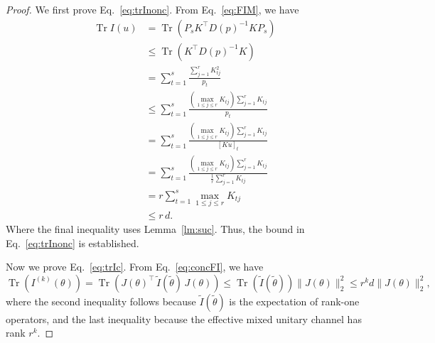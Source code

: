 \documentclass[10pt,a4paper]{amsart}
\begin{document}
\begin{proof}
We first prove Eq.~\ref{eq:trInonc}. From Eq.~\ref{eq:FIM}, we have
\begin{equation}
\begin{split}
    \operatorname{Tr}I(u)
    &= \operatorname{Tr}(P_s K^\top D(p)^{-1} K P_s) \\
    &\le \operatorname{Tr}(K^\top D(p)^{-1} K) \\
    &= \sum_{t=1}^{s}\frac{\sum_{j=1}^{r} K_{tj}^{2}}{p_t} \\
    &\le \sum_{t=1}^{s}\frac{(\max_{1\le j\le r} K_{tj})\sum_{j=1}^{r} K_{tj}}{p_t} \\
    &= \sum_{t=1}^{s}\frac{(\max_{1\le j\le r} K_{tj})\sum_{j=1}^{r} K_{tj}}{[Ku]_t} \\
    &= \sum_{t=1}^{s}\frac{(\max_{1\le j\le r} K_{tj})\sum_{j=1}^{r} K_{tj}}{\frac{1}{r}\sum_{j=1}^{r} K_{tj}} \\
    &= r\sum_{t=1}^{s}\max_{1\le j\le r} K_{tj}\\
    &\le r\,d.
\end{split}
\end{equation}
Where the final inequality uses Lemma~\ref{lm:suc}. Thus, the bound in Eq.~\ref{eq:trInonc} is established.

Now we prove Eq.~\ref{eq:trIc}. From Eq.~\ref{eq:concFI}, we have
\begin{equation}\label{eq:trIJconc}
    \operatorname{Tr}(I^{(k)}(\theta)) 
    = \operatorname{Tr}(J(\theta)^{\top} \, \tilde{I}(\tilde{\theta}) \, J(\theta)) 
    \le \operatorname{Tr}(\tilde{I}(\tilde{\theta})) \| J(\theta) \|_2^2 
    \le r^k d  \| J(\theta) \|_2^2,
\end{equation}
where the second inequality follows because $\tilde{I}(\tilde{\theta})$ is the expectation of rank-one operators, and the last inequality because the effective mixed unitary channel has rank $r^k$.


\end{proof}
\end{document}
